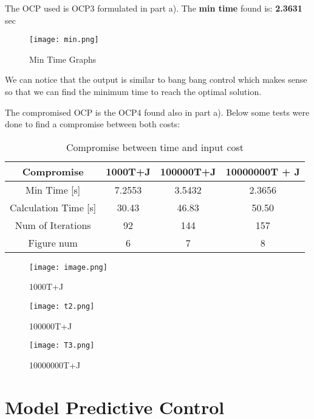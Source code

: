 \documentclass[a4paper, 12pt]{report}
\begin{document}
The OCP used is OCP3 formulated in part a). 
The \textbf{min time} found is: \textbf{2.3631} sec
\begin{figure}[h]
    \centering
    \texttt{[image: min.png]}
    \caption{Min Time Graphs}
    \label{fig:enter-label}
\end{figure}

We can notice that the output is similar to bang bang control which makes sense so that we can find the minimum time to reach the optimal solution.

The compromised OCP is the OCP4 found also in part a). 
Below some tests were done to find a compromise between both costs:

\begin{table}
    \centering
    \begin{tabular}{|c|c|c|c|}
        \hline
        Compromise & 1000T+J &100000T+J & 10000000T + J \\
        \hline
        Min Time [s]  & 7.2553&3.5432 & 2.3656 \\
        \hline
        Calculation Time [s] &30.43 &46.83&50.50\\
        \hline
        Num of Iterations & 92 &144 &157\\
        \hline
        Figure num &6 &7 &8\\
        \hline
    \end{tabular}
    \caption{Compromise between time and input cost}
    \label{tab:my_label}
\end{table}

\begin{figure}
    \centering
    \texttt{[image: image.png]}
    \caption{1000T+J}
    \label{fig:enter-img1}
\end{figure}

\begin{figure}
    \centering
    \texttt{[image: t2.png]}
    \caption{100000T+J}
    \label{fig:enter-img2}
\end{figure}


\begin{figure}
    \centering
    \texttt{[image: T3.png]}
    \caption{10000000T+J}
    \label{fig:enter-img3}
\end{figure}


\section{Model Predictive Control}
\end{document}
